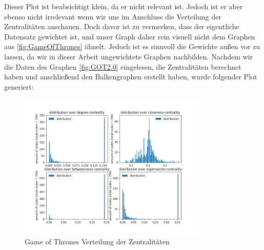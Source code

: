 Dieser Plot ist beabsichtigt klein, da er nicht relevant ist. Jedoch ist er aber ebenso nicht irrelevant wenn wir uns im Anschluss die Verteilung der Zentralitäten anschauen. Doch davor ist zu vermerken, dass der eigentliche Datensatz gewichtet ist, und unser Graph daher rein visuell nicht dem Graphen aus \ref{fig:GameOfThrones} ähnelt. Jedoch ist es sinnvoll die Gewichte außen vor zu lassen, da wir in dieser Arbeit ungewichtete Graphen nachbilden. Nachdem wir die Daten des Graphen \ref{fig:GOT2.0} eingelesen, die Zentralitäten berechnet haben und anschließend den Balkengraphen erstellt haben, wurde folgender Plot generiert:

\FloatBarrier
\begin{figure}[h!]%
  \centering
   \includegraphics[width=0.8\textwidth]{Graphics/GOTdistribution.png}
  \caption{Game of Thrones Verteilung der Zentralitäten}
  \label{fig:distributionGOT}
\end{figure}
\FloatBarrier
 
